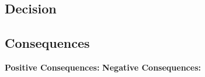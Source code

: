 \subsection*{Decision}

\subsection*{Consequences}
\textbf{Positive Consequences:}
\textbf{Negative Consequences:}
